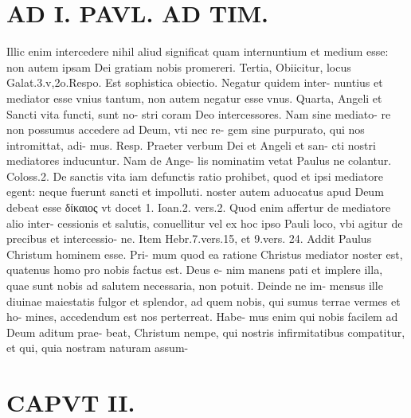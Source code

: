 \documentclass{article}
\begin{document}
\begin{pages}
\section*{AD I. PAVL. AD TIM. }
\marginpar{[ p.58 ]}\pstart Illic enim intercedere nihil aliud significat quam internuntium et medium esse: non autem ipsam Dei gratiam nobis promereri. Tertia, Obiicitur, locus Galat.3.v,2o.Respo. Est sophistica obiectio. Negatur quidem inter- nuntius et mediator esse vnius tantum, non autem negatur esse vnus. Quarta, Angeli et Sancti vita functi, sunt no- stri coram Deo intercessores. Nam sine mediato- re non possumus accedere ad Deum, vti nec re- gem sine purpurato, qui nos intromittat, adi- mus. Resp. Praeter verbum Dei et Angeli et san- cti nostri mediatores inducuntur. Nam de Ange- lis nominatim vetat Paulus ne colantur. Coloss.2. De sanctis vita iam defunctis ratio prohibet, quod et ipsi mediatore egent: neque fuerunt sancti et impolluti. noster autem aduocatus apud Deum debeat esse δίκαιος vt docet 1. Ioan.2. vers.2. Quod enim affertur de mediatore alio inter- cessionis et salutis, conuellitur vel ex hoc ipso Pauli loco, vbi agitur de precibus et intercessio- ne. Item Hebr.7.vers.15, et 9.vers. 24. Addit Paulus Christum hominem esse. Pri- mum quod ea ratione Christus mediator noster est, quatenus homo pro nobis factus est. Deus e- nim manens pati et implere illa, quae sunt nobis ad salutem necessaria, non potuit. Deinde ne im- mensus ille diuinae maiestatis fulgor et splendor, ad quem nobis, qui sumus terrae vermes et ho- mines, accedendum est nos perterreat. Habe- mus enim qui nobis facilem ad Deum aditum prae- beat, Christum nempe, qui nostris infirmitatibus compatitur, et qui, quia nostram naturam assum-  \pend
\section*{CAPVT  II. }
\marginpar{[ p.58 ]}\pstart {}
{}

\end{pages}
\end{document}
